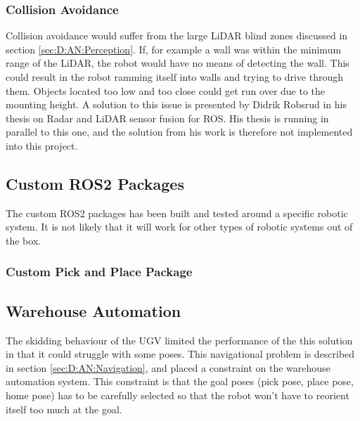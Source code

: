 \subsubsection{Collision Avoidance}
Collision avoidance would suffer from the large LiDAR blind zones discussed in section \ref{sec:D:AN:Perception}. If, for example a wall was within the minimum range of the LiDAR, the robot would have no means of detecting the wall. This could result in the robot ramming itself into walls and trying to drive through them. Objects located too low and too close could get run over due to the mounting height. A solution to this issue is presented by Didrik Robsrud in his thesis on Radar and LiDAR sensor fusion for ROS. His thesis is running in parallel to this one, and the solution from his work is therefore not implemented into this project.


\subsection{Custom ROS2 Packages}
The custom ROS2 packages has been built and tested around a specific robotic system. It is not likely that it will work for other types of robotic systems out of the box. 


\subsubsection{Custom Pick and Place Package}



\subsection{Warehouse Automation}
The skidding behaviour of the UGV limited the performance of the this solution in that it could struggle with some poses. This navigational problem is described in section \ref{sec:D:AN:Navigation}, and placed a constraint on the warehouse automation system. This constraint is that the goal poses (pick pose, place pose, home pose) has to be carefully selected so that the robot won't have to reorient itself too much at the goal. 

